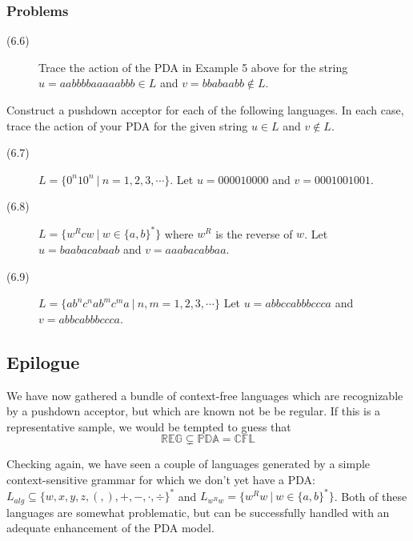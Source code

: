 \documentclass{article}
\begin{document}
\subsubsection*{Problems}

\begin{description}
  \item[(6.6)] Trace the action of the PDA in Example 5 above for the string $u = aabbbbaaaaabbb \in L$ and $v = bbabaabb \notin L$.
\end{description}

Construct a pushdown acceptor for each of the following languages. In each case, trace the action of your PDA for the given string $u \in L$ and $v \notin L$.

\begin{description}
  \item[(6.7)] $L = \{ 0^n 10^n\ |\ n=1,2,3,\cdots \}$. Let $u = 000010000$ and $v = 0001001001$. 
  \item[(6.8)] $L = \{ w^R cw\ |\ w \in \{a,b\}^* \}$ where $w^R$ is the reverse of $w$. Let $u = baabacabaab$ and $v = aaabacabbaa$. 
  \item[(6.9)] $L = \{ ab^n c^n ab^m c^ma\ |\ n,m=1,2,3,\cdots \}$ Let $u = abbccabbbccca$ and $v = abbcabbbccca$.
\end{description}


\subsection{Epilogue} %


We have now gathered a bundle of context-free languages which are recognizable by a pushdown acceptor, but which are known not be be regular. If this is a representative sample, we would be tempted to guess that
\begin{equation*}
\mathbb{REG} \subsetneq \mathbb{PDA} = \mathbb{CFL}
\end{equation*}

Checking again, we have seen a couple of languages generated by a simple context-sensitive grammar for which we don't yet have a PDA: $L_{alg} \subseteq \{ w,x,y,z,(,),+,-,\cdot,\div \}^*$ and $L_{w^Rw} = \{ w^Rw\ |\ w \in \{ a,b \}^* \}$. Both of these languages are somewhat problematic, but can be successfully handled with an adequate enhancement of the PDA model.
\end{document}
